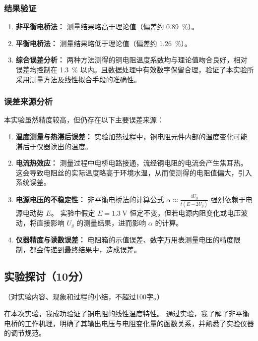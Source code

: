 \documentclass{../template/Report}%
\begin{document}
\begin{fullreportonly}
    \subsubsection{结果验证}
    \begin{enumerate}
        \item \textbf{非平衡电桥法：} 测量结果略高于理论值（偏差约 \SI{0.89}{\percent}）。
        \item \textbf{平衡电桥法：} 测量结果略低于理论值（偏差约 \SI{1.26}{\percent}）。
        \item \textbf{综合误差分析：} 两种方法测得的铜电阻温度系数均与理论值吻合良好，相对误差均控制在 \SI{1.3}{\percent} 以内。且数据处理中有效数字保留合理，验证了本实验所采用测量方法及线性拟合手段的准确性。
    \end{enumerate}

    \subsubsection{误差来源分析}
    本实验虽然精度较高，但仍存在以下主要误差来源：
    \begin{enumerate}
        \item \textbf{温度测量与热滞后误差：} 实验加热过程中，铜电阻元件内部的温度变化可能滞后于仪器读出的温度。
        \item \textbf{电流热效应：} 测量过程中电桥电路接通，流经铜电阻的电流会产生焦耳热。这会导致电阻丝的实际温度略高于环境水温，从而使测得的电阻值偏大，引入系统误差。
        \item \textbf{电源电压的不稳定性：} 非平衡电桥法的计算公式 $\alpha \approx \frac{4U_g}{t(E-2U_g)}$ 强烈依赖于电源电动势 $E$。
              实验中假定 $E=\SI{1.3}{\volt}$ 恒定不变，但若电源内阻变化或电压波动，将直接影响 $U_g$ 的测量结果，进而影响 $\alpha$ 的计算。
        \item \textbf{仪器精度与读数误差：} 电阻箱的示值误差、数字万用表测量电压的精度限制，都会传递到最终结果中，造成误差。
    \end{enumerate}

    \subsection{实验探讨（10分）}
    （对实验内容、现象和过程的小结，不超过100字。）

    在本次实验，我成功验证了铜电阻的线性温度特性。
    通过实验，我了解了非平衡电桥的工作机理，明确了其输出电压与电阻变化量的函数关系，并熟悉了实验仪器的调节规范。


\end{fullreportonly}
\end{document}
